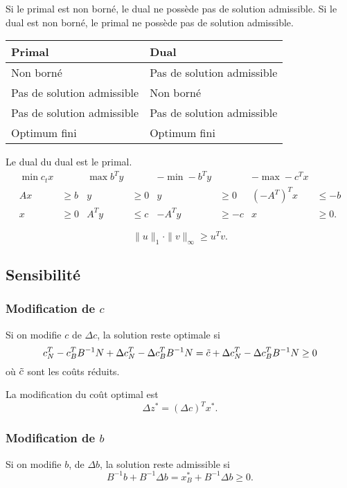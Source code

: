 \begin{mycorr}
  Si le primal est non borné, le dual ne possède pas de solution admissible.
  Si le dual est non borné, le primal ne possède pas de solution admissible.
\end{mycorr}
\begin{center}
  \begin{tabular}{l|l}
    Primal & Dual\\
    \hline
    Non borné & Pas de solution admissible\\
    Pas de solution admissible & Non borné\\
    Pas de solution admissible & Pas de solution admissible\\
    Optimum fini & Optimum fini
  \end{tabular}
\end{center}

\begin{mytheo}
  Le dual du dual est le primal.
  \begin{align*}
    \min c_tx & & \max b^Ty & & -\min -b^Ty & & -\max -c^Tx\\
    Ax & \geq b & y & \geq 0 & y & \geq 0 & (-A^T)^Tx & \leq -b\\
    x & \geq 0 & A^Ty & \leq c & -A^Ty & \geq -c & x & \geq 0.
  \end{align*}
\end{mytheo}

\begin{mytheo}
  \[ \|u\|_1\cdot\|v\|_\infty \geq u^Tv. \]
\end{mytheo}

\subsection{Sensibilité}
\subsubsection{Modification de $c$}
Si on modifie $c$ de $\Delta c$, la solution reste optimale si
\[ c_N^T - c_B^TB^{-1}N + \Delta c_N^T - \Delta c_B^TB^{-1}N
 = \tilde{c} + \Delta c_N^T - \Delta c_B^TB^{-1}N \geq 0 \]
où $\tilde{c}$ sont les coûts réduits.

La modification du coût optimal est
\[ \Delta z^* = (\Delta c)^T x^*. \]

\subsubsection{Modification de $b$}
Si on modifie $b$, de $\Delta b$, la solution reste admissible si
\[ B^{-1}b + B^{-1}\Delta b = x_B^* + B^{-1} \Delta b \geq 0. \]

